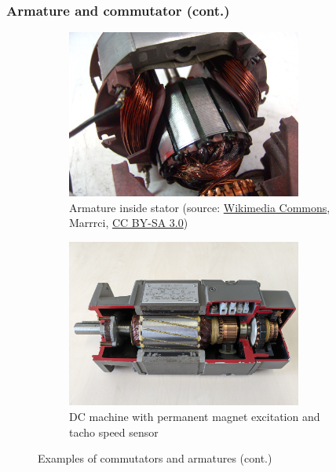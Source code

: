 \begin{frame}
	\frametitle{Armature and commutator (cont.)}
    \begin{figure}
		\ContinuedFloat
		\centering
		\begin{subfigure}[b]{0.49\textwidth}
			\centering
			\includegraphics[width=0.85\textwidth]{fig/lec03/Stator_Rotor_Universalmachine.jpg}
			\caption{Armature inside stator (source: \href{https://commons.wikimedia.org/wiki/File:Universalmotor_1.JPG}{Wikimedia Commons}, Marrrci, \href{https://creativecommons.org/licenses/by-sa/3.0/deed.en}{CC BY-SA 3.0})}
		\end{subfigure}
		\hfill
		\begin{subfigure}[b]{0.49\textwidth}
			\centering
			\includegraphics[width=0.85\textwidth]{fig/lec03/DC_Machine_PM.jpg}
			\caption{DC machine with permanent magnet excitation and tacho speed sensor}
		\end{subfigure}
		\caption{Examples of commutators and armatures (cont.)} 
        \label{fig:Armature_and_commutator_02}
	\end{figure}
\end{frame}

